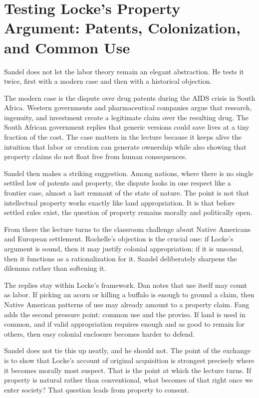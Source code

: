 \section{Testing Locke's Property Argument: Patents, Colonization, and Common Use}

Sandel does not let the labor theory remain an elegant abstraction. He tests it twice, first with a modern case and then with a historical objection.

The modern case is the dispute over drug patents during the AIDS crisis in South Africa. Western governments and pharmaceutical companies argue that research, ingenuity, and investment create a legitimate claim over the resulting drug. The South African government replies that generic versions could save lives at a tiny fraction of the cost. The case matters in the lecture because it keeps alive the intuition that labor or creation can generate ownership while also showing that property claims do not float free from human consequences.

Sandel then makes a striking suggestion. Among nations, where there is no single settled law of patents and property, the dispute looks in one respect like a frontier case, almost a last remnant of the state of nature. The point is not that intellectual property works exactly like land appropriation. It is that before settled rules exist, the question of property remains morally and politically open.

From there the lecture turns to the classroom challenge about Native Americans and European settlement. Rochelle's objection is the crucial one: if Locke's argument is sound, then it may justify colonial appropriation; if it is unsound, then it functions as a rationalization for it. Sandel deliberately sharpens the dilemma rather than softening it.

The replies stay within Locke's framework. Dan notes that use itself may count as labor. If picking an acorn or killing a buffalo is enough to ground a claim, then Native American patterns of use may already amount to a property claim. Fang adds the second pressure point: common use and the proviso. If land is used in common, and if valid appropriation requires enough and as good to remain for others, then easy colonial enclosure becomes harder to defend.

Sandel does not tie this up neatly, and he should not. The point of the exchange is to show that Locke's account of original acquisition is strongest precisely where it becomes morally most suspect. That is the point at which the lecture turns. If property is natural rather than conventional, what becomes of that right once we enter society? That question leads from property to consent.

